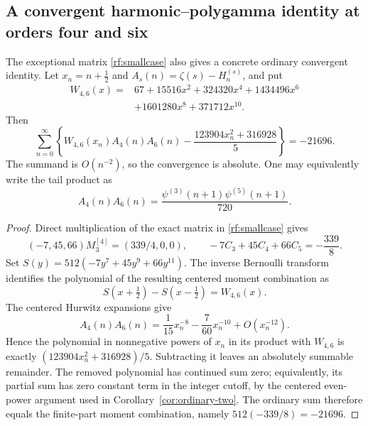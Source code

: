 \subsection{A convergent harmonic--polygamma identity at orders four and six}

The exceptional matrix \eqref{rf:smallcase} also gives a concrete
ordinary convergent identity.  Let $x_n=n+\tfrac12$ and
$A_s(n)=\zeta(s)-H_n^{(s)}$, and put
\[
 \begin{split}
 W_{4,6}(x)={}&67+15516x^2+324320x^4+1434496x^6\\
              &+1601280x^8+371712x^{10}.
 \end{split}
\]
Then
\begin{equation}\label{rf:ordinary-46}
 \boxed{\displaystyle
 \sum_{n=0}^{\infty}\left\{
 W_{4,6}(x_n)A_4(n)A_6(n)
 -\frac{123904x_n^2+316928}{5}\right\}=-21696.}
\end{equation}
The summand is $O(n^{-2})$, so the convergence is absolute.
One may equivalently write the tail product as
\[
 A_4(n)A_6(n)
 =\frac{\psi^{(3)}(n+1)\psi^{(5)}(n+1)}{720}.
\]

\begin{proof}
Direct multiplication of the exact matrix in
\eqref{rf:smallcase} gives
\[
 (-7,45,66)M_3^{[4]}=(339/4,0,0),
 \qquad -7C_3+45C_4+66C_5=-\frac{339}{8}.
\]
Set $S(y)=512(-7y^7+45y^9+66y^{11})$.  The inverse Bernoulli
transform identifies the polynomial of the resulting centered
moment combination as
\[
 S(x+\tfrac12)-S(x-\tfrac12)=W_{4,6}(x).
\]
The centered Hurwitz expansions give
\[
 A_4(n)A_6(n)=\frac1{15}x_n^{-8}
              -\frac7{60}x_n^{-10}+O(x_n^{-12}).
\]
Hence the polynomial in nonnegative powers of $x_n$ in its product
with $W_{4,6}$ is exactly
$(123904x_n^2+316928)/5$.  Subtracting it leaves an absolutely
summable remainder.  The removed polynomial has continued sum zero;
equivalently, its partial sum has zero constant term in the integer cutoff, by the
centered even-power argument used in
Corollary~\ref{cor:ordinary-two}.  The ordinary sum therefore equals
the finite-part moment combination, namely
$512(-339/8)=-21696$.
\end{proof}
